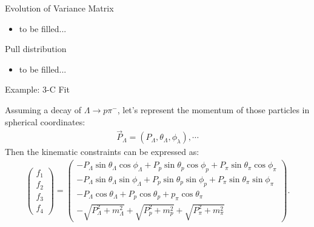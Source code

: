 \documentclass[
	xcolor=dvipsnames,
	10pt, 
	]{beamer}
\begin{document}
\begin{frame}{Evolution of Variance Matrix}
	\begin{itemize}
		\item{to be filled...}
	\end{itemize}
\end{frame}
\begin{frame}{Pull distribution}
	\begin{itemize}
	\item{to be filled...}
\end{itemize}
\end{frame} 
\begin{frame}{Example: 3-C Fit }
	\begin{block}{}
		Assuming a decay of $\Lambda\to p\pi^-$, let's represent the momentum of those particles in spherical coordinates:
		\begin{align}
			\vec{P}_\Lambda = (P_\Lambda,\theta_\Lambda,\phi_\lambda),\cdots
		\end{align}
		Then the kinematic constraints can be expressed as:
		\begin{align}
			\begin{pmatrix}
				f_1\\f_2\\f_3\\f_4
			\end{pmatrix}=
			\begin{pmatrix}
			-P_\Lambda\sin\theta_\Lambda\cos\phi_\Lambda+P_p\sin\theta_p\cos\phi_p+P_\pi\sin\theta_\pi\cos\phi_\pi\\
			-P_\Lambda\sin\theta_\Lambda\sin\phi_\Lambda+P_p\sin\theta_p\sin\phi_p+P_\pi\sin\theta_\pi\sin\phi_\pi\\
			-P_\Lambda\cos\theta_\Lambda+P_p\cos\theta_p+p_\pi\cos\theta_\pi\\
			-\sqrt{P_\Lambda^2+m_\Lambda^2}+\sqrt{P_p^2+m_p^2}+\sqrt{P_\pi^2+m_\pi^2}
			\end{pmatrix}.\label{FMat}
		\end{align}
	\end{block}
\end{frame}
\end{document}
